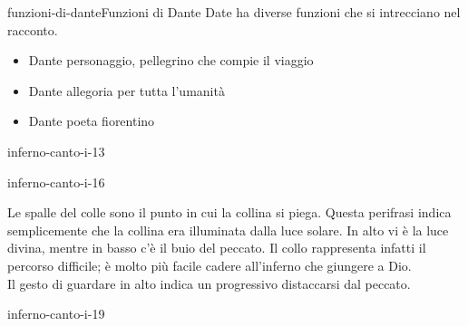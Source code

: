 \documentclass[preview]{standalone}
\begin{document}
\begin{snippetnote}{funzioni-di-dante}{Funzioni di Dante}
    Date ha diverse funzioni che si intrecciano nel racconto.
    \begin{itemize}
        \item Dante personaggio, pellegrino che compie il viaggio
        \item Dante allegoria per tutta l'umanità
        \item Dante poeta fiorentino
    \end{itemize}
\end{snippetnote}

\begin{snippet}{inferno-canto-i-13}

\end{snippet}

\begin{snippet}{inferno-canto-i-16}

    Le spalle del colle sono il punto in cui la collina si piega.
    Questa perifrasi indica semplicemente che la collina era illuminata dalla luce solare.
    In alto vi è la luce divina, mentre in basso c'è il buio del peccato.
    Il collo rappresenta infatti il percorso difficile; è molto più facile
    cadere all'inferno che giungere a Dio. \\
    Il gesto di guardare in alto indica un progressivo distaccarsi dal peccato.
\end{snippet}

\begin{snippet}{inferno-canto-i-19}

\end{snippet}
\end{document}
